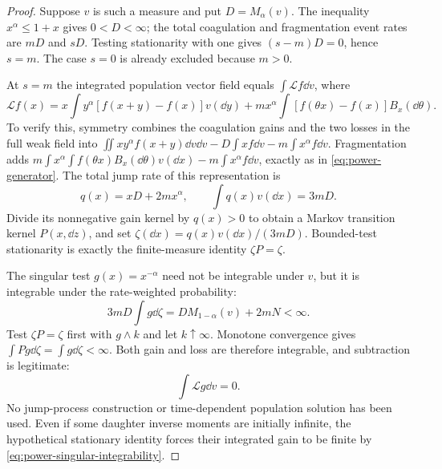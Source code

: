 \begin{proof}
Suppose $v$ is such a measure and put $D=M_\alpha(v)$.
The inequality $x^\alpha\leq1+x$ gives $0<D<\infty$; the total coagulation
and fragmentation event rates are $mD$ and $sD$. Testing stationarity
with one gives $(s-m)D=0$, hence $s=m$. The case $s=0$ is already excluded
because $m>0$.

At $s=m$ the integrated population vector field equals
$\int\mathcal Lf\dd v$, where
\begin{equation}
 \mathcal Lf(x)
 =x\int y^\alpha[f(x+y)-f(x)]v(\dd y)
  +mx^\alpha\int[f(\theta x)-f(x)]B_x(\dd\theta).
 \label{eq:power-generator}
\end{equation}
To verify this, symmetry combines the coagulation gains and the two
losses in the full weak field into
$\iint xy^\alpha f(x+y)\dd v\dd v-D\int xf\dd v-m\int x^\alpha f\dd v$.
Fragmentation adds $m\int x^\alpha\int f(\theta x)B_x(\dd\theta)v(\dd x)
-m\int x^\alpha f\dd v$, exactly as in \eqref{eq:power-generator}.
The total jump rate of this representation is
\begin{equation}
 q(x)=xD+2mx^\alpha,
 \qquad \int q(x)v(\dd x)=3mD.
 \label{eq:power-rate}
\end{equation}
Divide its nonnegative gain kernel by $q(x)>0$ to obtain a Markov
transition kernel $P(x,\dd z)$, and set
$\zeta(\dd x)=q(x)v(\dd x)/(3mD)$. Bounded-test stationarity is exactly
the finite-measure identity $\zeta P=\zeta$.

The singular test $g(x)=x^{-\alpha}$ need not be integrable under $v$,
but it is integrable under the rate-weighted probability:
\begin{equation}
 3mD\int g\dd\zeta=D M_{1-\alpha}(v)+2mN<\infty.
 \label{eq:power-singular-integrability}
\end{equation}
Test $\zeta P=\zeta$ first with $g\wedge k$ and let $k\uparrow\infty$.
Monotone convergence gives $\int Pg\dd\zeta=\int g\dd\zeta<\infty$.
Both gain and loss are therefore integrable, and subtraction is legitimate:
\begin{equation}
 \int\mathcal Lg\dd v=0.
 \label{eq:power-singular-balance}
\end{equation}
No jump-process construction or time-dependent population solution has
been used. Even if some daughter inverse moments are initially infinite,
the hypothetical stationary identity forces their integrated gain to be
finite by \eqref{eq:power-singular-integrability}.


\end{proof}
